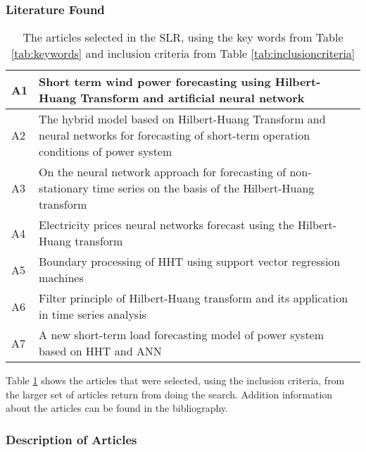 \subsubsection{Literature Found}
\label{sec:literature}
\begin{table}[h]
\centering
\begin{tabular}{|l|p{12cm}|} \hline
A1 & Short term wind power forecasting using Hilbert-Huang Transform and artificial neural network\cite{annForecastingModel}\\ \hline
A2 & The hybrid model based on Hilbert-Huang Transform and neural networks for forecasting of short-term operation conditions of power system\cite{hhtTransformModel}\\ \hline
A3 & On the neural network approach for forecasting of non-stationary time series on the basis of the Hilbert-Huang transform\cite{neuralNetAproach}\\ \hline
A4 & Electricity prices neural networks forecast using the Hilbert-Huang transform\cite{electricityPrices} \\ \hline
A5 & Boundary processing of HHT using support vector regression machines\cite{boundaryProcessing} \\ \hline
A6 & Filter principle of Hilbert-Huang transform and its application in time series analysis\cite{filter} \\ \hline
A7 & A new short-term load forecasting model of power system based on HHT and ANN \cite{powersystem}\\ \hline
\end{tabular}
\caption{The articles selected in the SLR, using the key words from Table \ref{tab:keywords} and inclusion criteria from Table \ref{tab:inclusioncriteria}}
\label{tab:articles}
\end{table}

Table \ref{tab:articles} shows the articles that were selected, using the inclusion criteria, from the larger set of articles return from doing the search. Addition information about the articles can be found in the bibliography.

\subsubsection{Description of Articles}
\label{sec:description}


